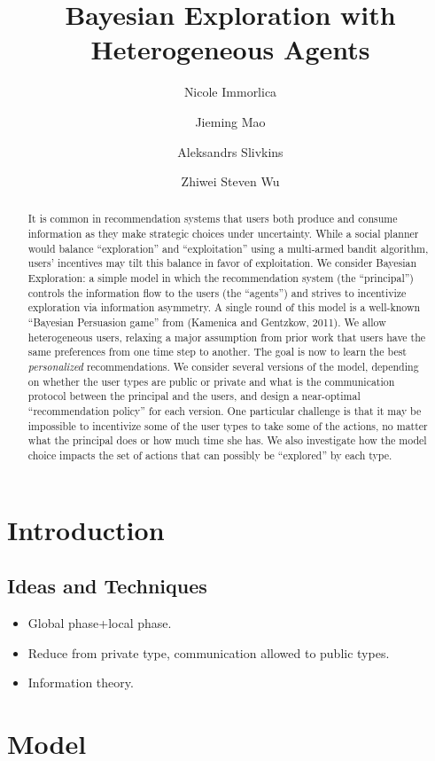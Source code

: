 \documentclass[11pt]{article}
\title{Bayesian Exploration with Heterogeneous Agents}
\author{
Nicole Immorlica
\and
Jieming Mao
\and
Aleksandrs Slivkins
\and
Zhiwei Steven Wu
}
\begin{document}
\maketitle


\begin{abstract}
It is common in recommendation systems that users both produce and consume information as they make strategic choices under uncertainty. While a social planner would balance “exploration” and “exploitation” using a multi-armed bandit algorithm, users’ incentives may tilt this balance in favor of exploitation. We consider Bayesian Exploration: a simple model in which the recommendation system (the “principal”) controls the information flow to the users (the “agents”) and strives to incentivize exploration via information asymmetry. A single round of this model is a well-known “Bayesian Persuasion game” from (Kamenica and Gentzkow, 2011). We allow heterogeneous users, relaxing a major assumption from prior work that users have the same preferences from one time step to another. The goal is now to learn the best \emph{personalized} recommendations. We consider several versions of the model, depending on whether the user types are public or private and what is the communication protocol between the principal and the users, and design a near-optimal “recommendation policy” for each version. One particular challenge is that it may be impossible to incentivize some of the user types to take some of the actions, no matter what the principal does or how much time she has. We also investigate how the model choice impacts the set of actions that can possibly be “explored” by each type.
\end{abstract}

\section{Introduction}

\subsection{Ideas and Techniques}
\begin{itemize}
\item Global phase+local phase.
\item Reduce from private type, communication allowed to public types.
\item Information theory.
\end{itemize}

\section{Model}
\end{document}
